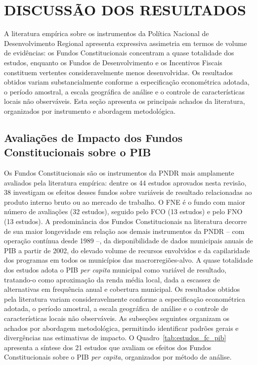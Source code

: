 
\section{DISCUSSÃO DOS RESULTADOS}
\label{sec:resultados}

A literatura empírica sobre os instrumentos da Política Nacional de Desenvolvimento Regional apresenta expressiva assimetria em termos de volume de evidências: os Fundos Constitucionais concentram a quase totalidade dos estudos, enquanto os Fundos de Desenvolvimento e os Incentivos Fiscais constituem vertentes consideravelmente menos desenvolvidas. Os resultados obtidos variam substancialmente conforme a especificação econométrica adotada, o período amostral, a escala geográfica de análise e o controle de características locais não observáveis. Esta seção apresenta os principais achados da literatura, organizados por instrumento e abordagem metodológica.

\subsection{Avaliações de Impacto dos Fundos Constitucionais sobre o PIB}
\label{subsec:fc-pib}

Os Fundos Constitucionais são os instrumentos da PNDR mais amplamente avaliados pela literatura empírica: dentre os 44 estudos aprovados nesta revisão, 38 investigam os efeitos desses fundos sobre variáveis de resultado relacionadas ao produto interno bruto ou ao mercado de trabalho. O FNE é o fundo com maior número de avaliações (32 estudos), seguido pelo FCO (13 estudos) e pelo FNO (13 estudos). A predominância dos Fundos Constitucionais na literatura decorre de sua maior longevidade em relação aos demais instrumentos da PNDR -- com operação contínua desde 1989 --, da disponibilidade de dados municipais anuais de PIB a partir de 2002, do elevado volume de recursos envolvidos e da capilaridade dos programas em todos os municípios das macrorregiões-alvo. A quase totalidade dos estudos adota o PIB \textit{per capita} municipal como variável de resultado, tratando-o como aproximação da renda média local, dada a escassez de alternativas em frequência anual e cobertura municipal. Os resultados obtidos pela literatura variam consideravelmente conforme a especificação econométrica adotada, o período amostral, a escala geográfica de análise e o controle de características locais não observáveis. As subseções seguintes organizam os achados por abordagem metodológica, permitindo identificar padrões gerais e divergências nas estimativas de impacto. O Quadro~\ref{tab:estudos_fc_pib} apresenta a síntese dos 21 estudos que avaliam os efeitos dos Fundos Constitucionais sobre o PIB \textit{per capita}, organizados por método de análise.

